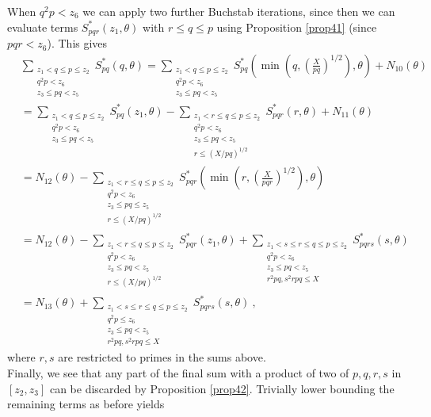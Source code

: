 \documentclass{amsart}
\numberwithin{equation}{subsection}
\begin{document}
When $q^2p<z_6$ we can apply two further Buchstab iterations, since then we can evaluate terms $S_{pqr}^*(z_1, \theta)$ with $r\leq q\leq p$ using Proposition \ref{prop41} (since $pqr<z_6$). This gives
\begin{align*}
&\sum_{\substack{z_1<q\leq p\leq z_2 \\ q^2p<z_6 \\ z_3\leq pq< z_5}} S_{pq}^*(q, \theta)= \sum_{\substack{z_1<q\leq p\leq z_2 \\ q^2p<z_6 \\ z_3\leq pq< z_5}} S_{pq}^*\left( \min\left(q,\left(\frac{X}{pq}\right)^{1/2}\right), \theta \right)+N_{10}(\theta)\\
&= \sum_{\substack{z_1<q\leq p\leq z_2 \\ q^2p<z_6 \\ z_3\leq pq< z_5}} S_{pq}^*(z_1, \theta) - \sum_{\substack{z_1<r\leq q\leq p\leq z_2 \\ q^2p<z_6 \\ z_3\leq pq< z_5 \\ r\leq (X/pq)^{1/2}}} S_{pqr}^*(r, \theta) +N_{11}(\theta)\\
&=N_{12}(\theta)- \sum_{\substack{z_1<r\leq q\leq p\leq z_2 \\ q^2p<z_6 \\ z_3\leq pq\leq  z_5 \\ r\leq (X/pq)^{1/2}}} S_{pqr}^*\left( \min\left(r,\left(\frac{X}{pqr}\right)^{1/2}\right), \theta \right)\\
&=N_{12}(\theta)-\sum_{\substack{z_1<r\leq q\leq p\leq z_2 \\ q^2p<z_6 \\ z_3\leq pq<  z_5 \\ r\leq (X/pq)^{1/2}}} S_{pqr}^*(z_1, \theta)+
\sum_{\substack{z_1<s\leq r\leq q\leq p\leq z_2 \\ q^2p<z_6 \\ z_3\leq pq<  z_5 \\ r^2pq, s^2rpq\leq X}} S_{pqrs}^*(s, \theta)\\
&=N_{13}(\theta)+\sum_{\substack{z_1<s\leq r\leq q\leq p\leq z_2 \\ q^2p\leq z_6 \\ z_3\leq pq<  z_5 \\ r^2pq, s^2rpq\leq X}} S_{pqrs}^*(s, \theta)\:,
\end{align*}
%
where $r,s$ are restricted to primes in the sums above.\\
Finally, we see that any part of the final sum with a product of two of $p,q,r,s$ in $[z_2, z_3]$ can be discarded by Proposition \ref{prop42}. Trivially lower bounding the remaining terms as before yields
\end{document}
